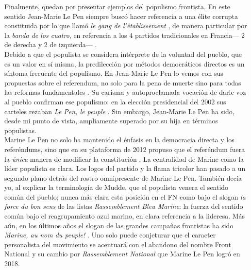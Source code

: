 Finalmente, quedan por presentar ejemplos del populismo frontista. En este sentido Jean-Marie Le Pen siempre buscó hacer referencia a una élite corrupta constituida por lo que llamó \textit{le gang de l'établissement} \parencite{Leprince16}, de manera particular por la \textit{banda de los cuatro}, en referencia a los 4 partidos tradicionales en Francia--- 2 de derecha y 2 de izquierda--- \parencite{Boily05}.\\ 

Debido a que el populista se considera intérprete de la voluntad del pueblo, que es un valor en sí misma, la predilección por métodos democráticos directos es un síntoma frecuente del populismo. En Jean-Marie Le Pen lo vemos con sus propuestas sobre el referendum, no solo para la pena de muerte sino para todas las reformas fundamentales \parencite{LObs07}. Su carisma y autoproclamada vocación de darle voz al pueblo confirman ese populismo: en la elección presidencial del 2002 sus carteles rezaban \textit{Le Pen, le peuple} \parencite{Gross16}. Sin embargo, Jean-Marie Le Pen ha sido, desde mi punto de vista, ampliamente superado por su hija en términos populistas.\\ 

Marine Le Pen no solo ha mantenido el énfasis en la democracia directa y los referéndums, sino que en su plataforma de 2012 propuso que el referéndum fuera la \textit{única} manera de modificar la constitución \parencite[énfasis mío]{LePen12}. La centralidad de Marine como la líder populista es clara. Los logos del partido y la flama tricolor han pasado a un segundo plano detrás del rostro omnipresente de Marine Le Pen. También decía yo, al explicar la terminología de Mudde, que el populista venera el sentido común del pueblo; nunca más clara esta posición en el FN como bajo el slogan \textit{la force du bon sens} de las listas \textit{Rassemblement Bleu Marine}: la fuerza del sentido común bajo el reagrupamiento azul marino, en clara referencia a la lideresa. Más aún, en los últimos años el slogan de las grandes campañas frontistas ha sido \textit{Marine, au nom du peuple!} \parencite{Gross16}. Uno solo puede conjeturar que el caracter personalista del movimiento se acentuará con el abandono del nombre Front National y su cambio por \textit{Rassemblement National} que Marine Le Pen logró en 2018.